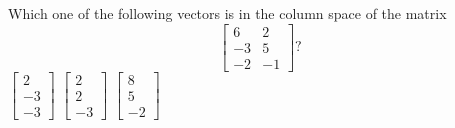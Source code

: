 \begin{activity}
Which one of the following vectors is in the column space of the matrix
\begin{equation*}
\begin{bmatrix} 6 &  2
\\  -3 &  5
\\  -2 & -1 \end{bmatrix}?
\end{equation*}
{\(\begin{bmatrix} 2\\-3\\-3 \end{bmatrix}\)}
{\(\begin{bmatrix} 2\\2\\-3 \end{bmatrix}\)}
{\(\begin{bmatrix} 8\\5\\-2 \end{bmatrix}\)}
\end{activity}




